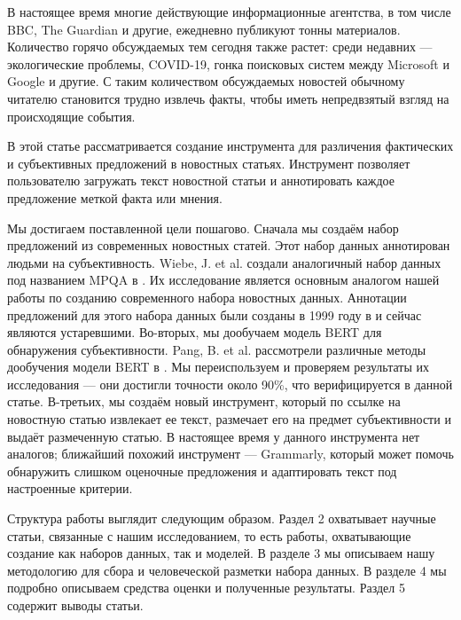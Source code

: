 \documentclass[conference]{IEEEtran}
\begin{document}
В настоящее время многие действующие информационные агентства, в том числе BBC, The Guardian и другие, ежедневно публикуют тонны материалов. Количество горячо обсуждаемых тем сегодня также растет: среди недавних — экологические проблемы, COVID-19, гонка поисковых систем между Microsoft и Google и другие. С таким количеством обсуждаемых новостей обычному читателю становится трудно извлечь факты, чтобы иметь непредвзятый взгляд на происходящие события.

В этой статье рассматривается создание инструмента для различения фактических и субъективных предложений в новостных статьях. Инструмент позволяет пользователю загружать текст новостной статьи и аннотировать каждое предложение меткой факта или мнения.

Мы достигаем поставленной цели пошагово. Сначала мы создаём набор предложений из современных новостных статей. Этот набор данных аннотирован людьми на субъективность. Wiebe, J. et al. создали аналогичный набор данных под названием MPQA в \cite{mpqa}. Их исследование является основным аналогом нашей работы по созданию современного набора новостных данных. Аннотации предложений для этого набора данных были созданы в 1999 году в \cite{mpqa-opinion} и сейчас являются устаревшими. Во-вторых, мы дообучаем модель BERT для обнаружения субъективности. Pang, B. et al. рассмотрели различные методы дообучения модели BERT в \cite{bert-finetune}. Мы переиспользуем и проверяем результаты их исследования --- они достигли точности около 90\%, что верифицируется в данной статье. В-третьих, мы создаём новый инструмент, который по ссылке на новостную статью извлекает ее текст, размечает его на предмет субъективности и выдаёт размеченную статью. В настоящее время у данного инструмента нет аналогов; ближайший похожий инструмент — Grammarly, который может помочь обнаружить слишком оценочные предложения и адаптировать текст под настроенные критерии.

Структура работы выглядит следующим образом. Раздел 2 охватывает научные статьи, связанные с нашим исследованием, то есть работы, охватывающие создание как наборов данных, так и моделей. В разделе 3 мы описываем нашу методологию для сбора и человеческой разметки набора данных. В разделе 4 мы подробно описываем средства оценки и полученные результаты. Раздел 5 содержит выводы статьи.
\end{document}

